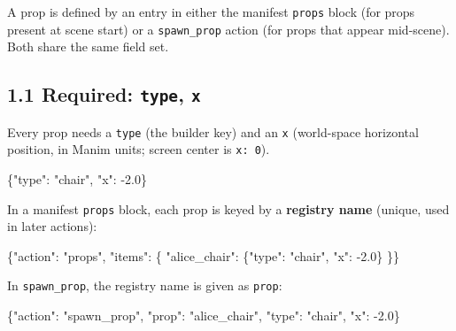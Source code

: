 \documentclass[
  12pt,
  letterpaper,
]{book}
\newenvironment{Shaded}{}{}
\newcommand{\DataTypeTok}[1]{\textcolor[rgb]{0.56,0.13,0.00}{#1}}
\newcommand{\FloatTok}[1]{\textcolor[rgb]{0.25,0.63,0.44}{#1}}
\newcommand{\FunctionTok}[1]{\textcolor[rgb]{0.02,0.16,0.49}{#1}}
\newcommand{\StringTok}[1]{\textcolor[rgb]{0.25,0.44,0.63}{#1}}
\begin{document}
A prop is defined by an entry in either the manifest \texttt{props}
block (for props present at scene start) or a \texttt{spawn\_prop}
action (for props that appear mid-scene). Both share the same field set.

\subsection{\texorpdfstring{1.1 Required: \texttt{type},
\texttt{x}}{1.1 Required: type, x}}\label{required-type-x}

Every prop needs a \texttt{type} (the builder key) and an \texttt{x}
(world-space horizontal position, in Manim units; screen center is
\texttt{x:\ 0}).

\begin{Shaded}
\begin{Highlighting}[]
\FunctionTok{\{}\DataTypeTok{"type"}\FunctionTok{:} \StringTok{"chair"}\FunctionTok{,} \DataTypeTok{"x"}\FunctionTok{:} \FloatTok{{-}2.0}\FunctionTok{\}}
\end{Highlighting}
\end{Shaded}

In a manifest \texttt{props} block, each prop is keyed by a
\textbf{registry name} (unique, used in later actions):

\begin{Shaded}
\begin{Highlighting}[]
\FunctionTok{\{}\DataTypeTok{"action"}\FunctionTok{:} \StringTok{"props"}\FunctionTok{,} \DataTypeTok{"items"}\FunctionTok{:} \FunctionTok{\{}
  \DataTypeTok{"alice\_chair"}\FunctionTok{:} \FunctionTok{\{}\DataTypeTok{"type"}\FunctionTok{:} \StringTok{"chair"}\FunctionTok{,} \DataTypeTok{"x"}\FunctionTok{:} \FloatTok{{-}2.0}\FunctionTok{\}}
\FunctionTok{\}\}}
\end{Highlighting}
\end{Shaded}

In \texttt{spawn\_prop}, the registry name is given as \texttt{prop}:

\begin{Shaded}
\begin{Highlighting}[]
\FunctionTok{\{}\DataTypeTok{"action"}\FunctionTok{:} \StringTok{"spawn\_prop"}\FunctionTok{,} \DataTypeTok{"prop"}\FunctionTok{:} \StringTok{"alice\_chair"}\FunctionTok{,}
 \DataTypeTok{"type"}\FunctionTok{:} \StringTok{"chair"}\FunctionTok{,} \DataTypeTok{"x"}\FunctionTok{:} \FloatTok{{-}2.0}\FunctionTok{\}}
\end{Highlighting}
\end{Shaded}
\end{document}
